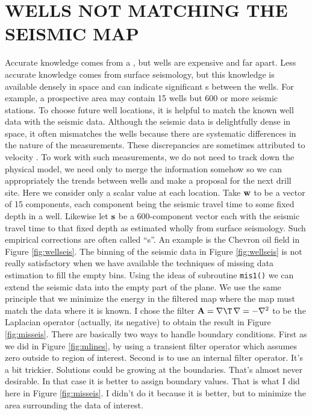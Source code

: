 \section{WELLS NOT MATCHING THE SEISMIC MAP}
Accurate knowledge comes from a ,
but wells are expensive and far apart.
Less accurate knowledge comes from surface seismology,
but this knowledge is available densely in space
and can indicate significant s between the wells.
For example,
a prospective area may contain 15 wells
but 600 or more seismic stations.
To choose future well locations,
it is helpful to match the known well data with the seismic data.
Although the seismic data is delightfully dense in space,
it often mismatches the wells
because there are systematic differences in the nature of the measurements.
These discrepancies
are sometimes attributed to velocity .
To work with such measurements,
we do not need to track down the physical model,
we need only to merge the information somehow
so we can appropriately  the trends between wells
and make a proposal for the next drill site.
Here we consider only a scalar value at each location.
Take $\bold w$ to be a vector of 15 components,
each component being the seismic travel time to some fixed depth in a well.
Likewise let $\bold s$ be a 600-component vector
each with the seismic travel time to that fixed depth
as estimated wholly from surface seismology.
Such empirical corrections are often called ``s''.
An example is the Chevron oil field in Figure \ref{fig:wellseis}.
The binning of the seismic data in Figure \ref{fig:wellseis}
is not really satisfactory when we have available
the techniques of missing data estimation
to fill the empty bins.
Using the ideas of subroutine \texttt{mis1()} 
we can extend the seismic data into the empty part of the plane.
We use the same principle that we minimize the energy in 
the filtered map where the map must match the data where it is known.
I chose the filter $\bold A = \nabla\T\,\nabla=-\nabla^2$
to be the Laplacian operator (actually, its negative)
to obtain the result in Figure \ref{fig:misseis}.
There are basically two ways to handle boundary conditions.
First as we did in Figure \ref{fig:mlines},
by using a transient filter operator
which assumes zero outside to region of interest.
Second is to use an internal filter operator.
It's a bit trickier.
Solutions could be growing at the boundaries.
That's almost never desirable.
In that case it is better to assign boundary values.
That is what I did here in Figure \ref{fig:misseis}.
I didn't do it because it is better,
but to minimize the area surrounding the data of interest.


